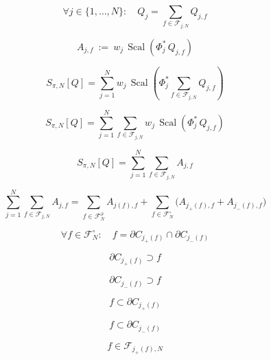 \documentclass[12pt]{article}
\begin{document}
\begin{equation}
\forall j\in\{1,\dots,N\}:\quad Q_j=\sum_{f\in\mathcal{F}_{j,N}}Q_{j,f}
\end{equation}

\begin{equation}
A_{j,f}\ :=\ w_j\,\operatorname{Scal}\!\left(\Phi_j^*\,Q_{j,f}\right)
\end{equation}

\begin{equation}
S_{\pi,N}[Q]=\sum_{j=1}^N w_j\,\operatorname{Scal}\!\left(\Phi_j^*\sum_{f\in\mathcal{F}_{j,N}}Q_{j,f}\right)
\end{equation}

\begin{equation}
S_{\pi,N}[Q]=\sum_{j=1}^N \sum_{f\in\mathcal{F}_{j,N}} w_j\,\operatorname{Scal}\!\left(\Phi_j^*\,Q_{j,f}\right)
\end{equation}

\begin{equation}
S_{\pi,N}[Q]=\sum_{j=1}^N \sum_{f\in\mathcal{F}_{j,N}} A_{j,f}
\end{equation}

\begin{equation}
\sum_{j=1}^N \sum_{f\in\mathcal{F}_{j,N}} A_{j,f}
=\sum_{f\in\mathcal{F}_N^\partial}A_{j(f),f}
+\sum_{f\in\mathcal{F}_N^\circ}\Big(A_{j_+(f),f}+A_{j_-(f),f}\Big)
\end{equation}

\begin{equation}
\forall f\in\mathcal{F}_N^\circ:\quad f=\partial C_{j_+(f)}\cap\partial C_{j_-(f)}
\end{equation}

\begin{equation}
\partial C_{j_+(f)}\supset f
\end{equation}

\begin{equation}
\partial C_{j_-(f)}\supset f
\end{equation}

\begin{equation}
f\subset\partial C_{j_+(f)}
\end{equation}

\begin{equation}
f\subset\partial C_{j_-(f)}
\end{equation}

\begin{equation}
f\in\mathcal{F}_{j_+(f),N}
\end{equation}
\end{document}
